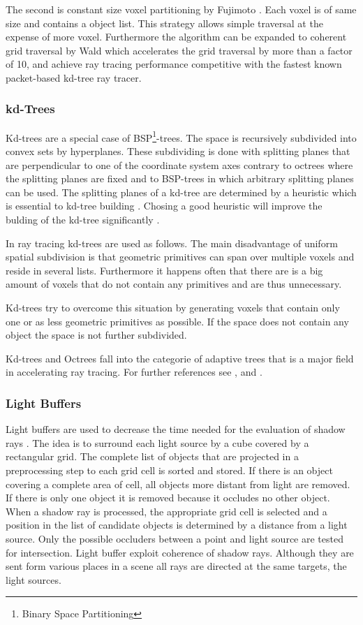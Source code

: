 \documentclass[DIV10, abstracton, openright, footsepline, headsepline, twoside, 9pt,
bigheadings]{scrreprt}
\begin{document}
The second is constant size voxel partitioning by Fujimoto \cite{IBMhb06}.
Each voxel is of same size and contains a object list. This strategy allows
simple traversal at the expense of more voxel. Furthermore the algorithm can be
expanded to coherent grid traversal by Wald \cite{Wald06Grid} which accelerates
the grid traversal by more than a factor of 10, and achieve ray tracing
performance competitive with the fastest known packet-based kd-tree ray tracer.

\subsubsection{kd-Trees}
Kd-trees are a special case of BSP\footnote{Binary Space Partitioning}-trees.
The space is recursively subdivided into convex sets by hyperplanes. These
subdividing is done with splitting planes that are perpendicular to one of the
coordinate system axes contrary to octrees \cite{octrees} where the splitting
planes are fixed and to BSP-trees in which arbitrary splitting planes can be
used. The splitting planes of a kd-tree are determined by a heuristic which
is essential to kd-tree building \cite{Havran2000:PhD}. Chosing a good
heuristic will improve the bulding of the kd-tree
significantly \cite{wald:06:NlogN}.

In ray tracing kd-trees are used as follows. The main disadvantage of uniform
spatial subdivision is that geometric primitives can span over multiple voxels
and reside in several lists. Furthermore it happens often that there are is a
big amount of voxels that do not contain any primitives and are thus unnecessary.

Kd-trees try to overcome this situation by generating voxels that
contain only one or as less geometric primitives as possible. If the
space does not contain any object the space is not further subdivided.

Kd-trees and Octrees fall into the categorie of adaptive trees that is a major
field in accelerating ray tracing. For further references see
\cite{Havran2000:PhD}, \cite{wald:06:NlogN} and \cite{Glassner89}.

\subsubsection{Light Buffers}
Light buffers are used to decrease the time needed for the evaluation of shadow
rays \cite{light-buffer}. The idea is to surround each light source by a cube
covered by a rectangular grid. The complete list of objects
that are projected in a preprocessing step to each grid cell is sorted and
stored. If there is an object covering a complete area of cell, all objects
more distant from light are removed. If there is only one object it is removed
because it occludes no other object. When a shadow ray is processed, the
appropriate grid cell is selected and a position in the list of candidate objects
 is determined by a distance from a light source. Only the possible occluders
between a point and light source are tested for intersection. Light buffer
exploit coherence of shadow rays. Although they are sent form various places in
a scene all rays are directed at the same targets, the light sources.
\end{document}
